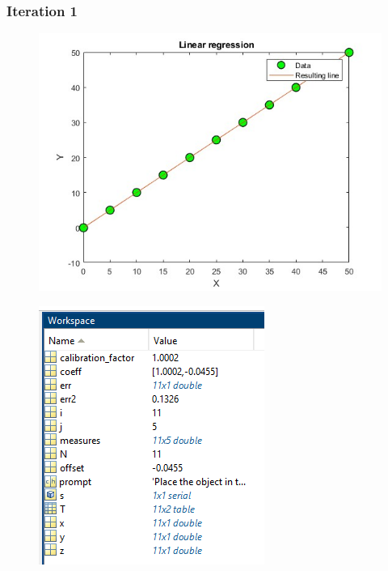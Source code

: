 \subsubsection{Iteration 1}

\begin{figure}[H]
\centering
\begin{minipage}{.6\textwidth} %
  \centering
  \includegraphics[width=.9\linewidth]{medias/test/calibration/figure_1.jpg}
  \label{fig:test3}
\end{minipage}%
\begin{minipage}{.4\textwidth} %
  \centering
  \includegraphics[width=.9\linewidth]{medias/test/calibration/workspace_1.png}
  \label{fig:test4}
\end{minipage}
\end{figure}


